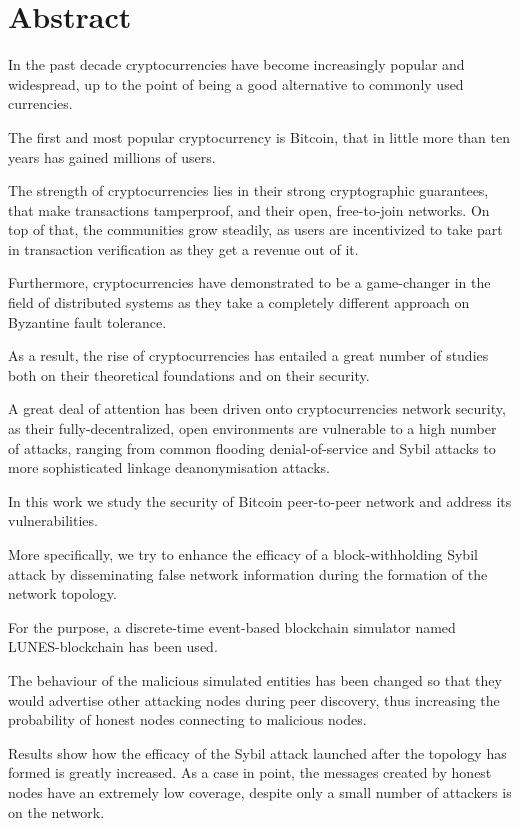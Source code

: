 \chapter*{Abstract} %
\label{sommario}

In the past decade cryptocurrencies have become increasingly popular and widespread, up to the point of being a good alternative to commonly used currencies.

The first and most popular cryptocurrency is Bitcoin, that in little more than ten years has gained millions of users.

The strength of cryptocurrencies lies in their strong cryptographic guarantees, that make transactions tamperproof, and their open, free-to-join networks. On top of that, the communities grow steadily, as users are incentivized to take part in transaction verification as they get a revenue out of it.
 
Furthermore, cryptocurrencies have demonstrated to be a game-changer in the field of distributed systems as they take a completely different approach on Byzantine fault tolerance.

As a result, the rise of cryptocurrencies has entailed a great number of studies both on their theoretical foundations and on their security.

A great deal of attention has been driven onto cryptocurrencies network security, as their fully-decentralized, open environments are vulnerable to a high number of attacks, ranging from common flooding denial-of-service and Sybil attacks to more sophisticated linkage deanonymisation attacks.

In this work we study the security of Bitcoin peer-to-peer network and address its vulnerabilities.

More specifically, we try to enhance the efficacy of a block-withholding Sybil attack by disseminating false network information during the formation of the network topology. 

For the purpose, a discrete-time event-based blockchain simulator named LUNES-blockchain has been used.

The behaviour of the malicious simulated entities has been changed so that they would advertise other attacking nodes during peer discovery, thus increasing the probability of honest nodes connecting to malicious nodes.

Results show how the efficacy of the Sybil attack launched after the topology has formed is greatly increased. As a case in point, the messages created by honest nodes have an extremely low coverage, despite only a small number of attackers is on the network. 

